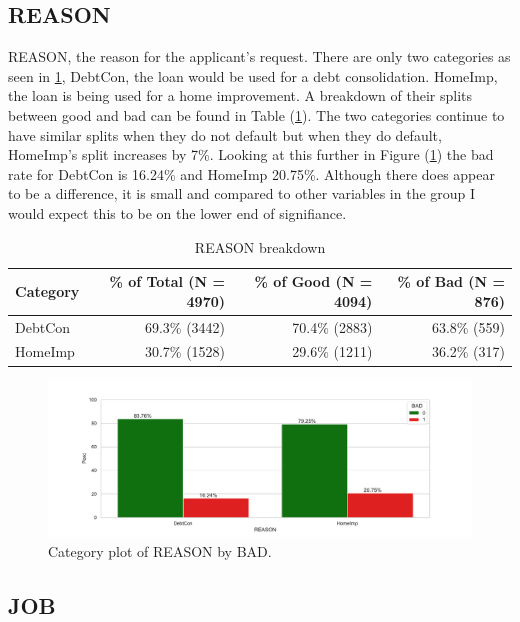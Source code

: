 \subsection*{REASON}

REASON,  the reason for the applicant's request. There are only two categories as seen in \ref{reason_cat},  DebtCon,  the loan would be used for a debt consolidation. HomeImp,  the loan is being used for a home improvement. A breakdown of their splits between good and bad can be found in Table (\ref{reason_count_tbl}). The two categories continue to have similar splits when they do not default but when they do default,  HomeImp's split increases by 7\%. Looking at this further in Figure (\ref{reason_cat}) the bad rate for DebtCon is 16.24\% and HomeImp 20.75\%. Although there does appear to be a difference,  it is small and compared to other variables in the group I would expect this to be on the lower end of signifiance.

\begin{table}[H]
	\centering
	\renewcommand{\arraystretch}{2}
	\begin{tabular}{lrrr}
		\toprule
		Category & \% of Total (N = 4970) & \% of Good (N = 4094) & \% of Bad (N = 876) \\
		\midrule
		DebtCon &  69.3\% (3442) & 70.4\% (2883) & 63.8\% (559)  \\
		HomeImp & 30.7\% (1528) & 29.6\% (1211) &  36.2\% (317)  \\
		\bottomrule
	\end{tabular}
	\caption{REASON breakdown \label{reason_count_tbl}}
\end{table}

\begin{figure}[H]
	\centering
	\includegraphics[scale=0.40]{figs/reason_cat.pdf}
	\caption{Category plot of REASON by BAD. \label{reason_cat}}
\end{figure}

\subsection*{JOB}

